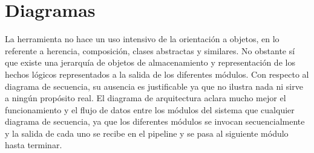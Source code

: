 \newpage
\chapter{Diagramas}
\label{chap:diagrams}
La herramienta no hace un uso intensivo de la orientación a objetos, en lo referente a herencia, composición, clases abstractas y similares. No obstante sí que existe una jerarquía de objetos de almacenamiento y representación de los hechos lógicos representados a la salida de los diferentes módulos. Con respecto al diagrama de secuencia, su ausencia es justificable ya que no ilustra nada ni sirve a ningún propósito real. El diagrama de arquitectura aclara mucho mejor el funcionamiento y el flujo de datos entre los módulos del sistema que cualquier diagrama de secuencia, ya que los diferentes módulos se invocan secuencialmente y la salida de cada uno se recibe en el pipeline y se pasa al siguiente módulo hasta terminar.

